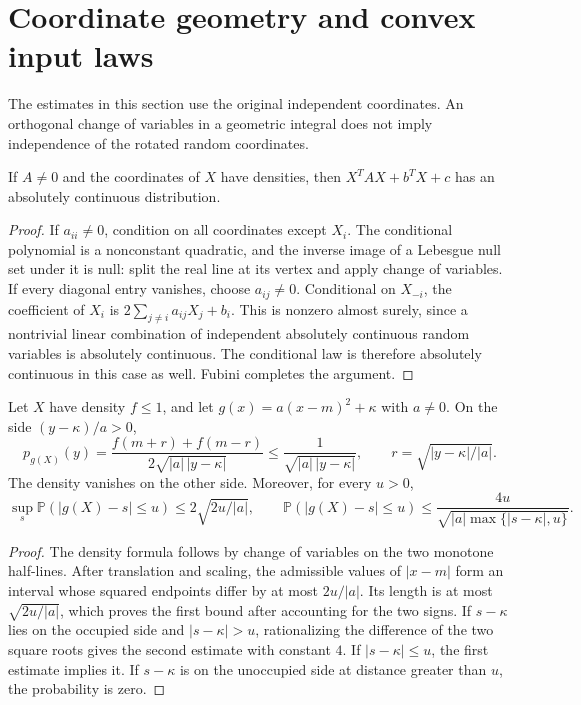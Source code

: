 \section{Coordinate geometry and convex input laws}\label{sec:geometry}

The estimates in this section use the original independent coordinates. An orthogonal change of variables in a geometric integral does not imply independence of the rotated random coordinates.

\begin{lemma}\label{geom:ac}
If $A\ne0$ and the coordinates of $X$ have densities, then $X^TAX+b^TX+c$ has an absolutely continuous distribution.
\end{lemma}
\begin{proof}
If $a_{ii}\ne0$, condition on all coordinates except $X_i$. The conditional polynomial is a nonconstant quadratic, and the inverse image of a Lebesgue null set under it is null: split the real line at its vertex and apply change of variables. If every diagonal entry vanishes, choose $a_{ij}\ne0$. Conditional on $X_{-i}$, the coefficient of $X_i$ is $2\sum_{j\ne i}a_{ij}X_j+b_i$. This is nonzero almost surely, since a nontrivial linear combination of independent absolutely continuous random variables is absolutely continuous. The conditional law is therefore absolutely continuous in this case as well. Fubini completes the argument.
\end{proof}

\begin{lemma}\label{geom:square}
Let $X$ have density $f\le1$, and let $g(x)=a(x-m)^2+\kappa$ with $a\ne0$. On the side $(y-\kappa)/a>0$,
\[
 p_{g(X)}(y)=\frac{f(m+r)+f(m-r)}{2\sqrt{|a|\,|y-\kappa|}}
 \le\frac1{\sqrt{|a|\,|y-\kappa|}},\qquad
 r=\sqrt{|y-\kappa|/|a|}.
\]
The density vanishes on the other side. Moreover, for every $u>0$,
\begin{equation}\label{eq:square-small}
 \sup_s\mathbb P(|g(X)-s|\le u)\le2\sqrt{2u/|a|},
 \qquad
 \mathbb P(|g(X)-s|\le u)
 \le\frac{4u}{\sqrt{|a|\max\{|s-\kappa|,u\}}}.
\end{equation}
\end{lemma}
\begin{proof}
The density formula follows by change of variables on the two monotone half-lines. After translation and scaling, the admissible values of $|x-m|$ form an interval whose squared endpoints differ by at most $2u/|a|$. Its length is at most $\sqrt{2u/|a|}$, which proves the first bound after accounting for the two signs. If $s-\kappa$ lies on the occupied side and $|s-\kappa|>u$, rationalizing the difference of the two square roots gives the second estimate with constant $4$. If $|s-\kappa|\le u$, the first estimate implies it. If $s-\kappa$ is on the unoccupied side at distance greater than $u$, the probability is zero.
\end{proof}

